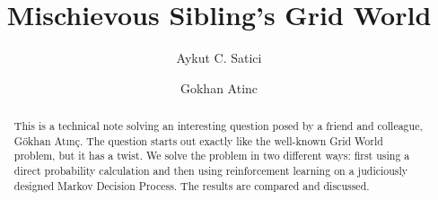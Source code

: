 \begin{frontmatter}



\title{Mischievous Sibling's Grid World}


\author[label1]{Aykut C. Satici}

\author[label2]{Gokhan Atinc}



\begin{abstract}
    This is a technical note solving an interesting question posed by a friend 
    and colleague, G\"{o}khan At{\i}n\c{c}. The question starts out
    exactly like the well-known Grid World problem, but it has a twist. We solve
    the problem in two different ways: first using a direct probability
    calculation and then using reinforcement learning on a judiciously designed
    Markov Decision Process. The results are compared and discussed.
\end{abstract}


\end{frontmatter}
